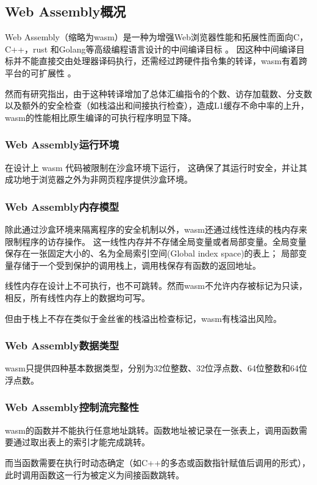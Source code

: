 \subsection{Web Assembly概况}
Web Assembly（缩略为wasm）是一种为增强Web浏览器性能和拓展性而面向C，C++，rust 和Golang等高级编程语言设计的中间编译目标
\cite{wasmCommunityGroup, lehmannWasabiFrameworkDynamically2019, lehmannEverythingOldNew, bhansaliFirstLookCode2022, waseemIssuesTheirCauses2024}。\nolinebreak
因这种中间编译目标并不能直接交由处理器译码执行，还需经过跨硬件指令集的转译，wasm有着跨平台的可扩展性
\cite{lehmannEverythingOldNew, waseemIssuesTheirCauses2024, lehmannWasabiFrameworkDynamically2019, JayProvablySafe}。

然而有研究\cite{JangdaNotsoFast}指出，由于这种转译增加了总体汇编指令的个数、访存加载数、分支数以及额外的安全检查（如栈溢出和间接执行检查），造成L1缓存不命中率的上升，wasm的性能相比原生编译的可执行程序明显下降。

\subsubsection{Web Assembly运行环境}
在设计上 wasm 代码被限制在沙盒环境下运行\cite{johnsonWaVeVerifiablySecure2023,WasmbpfStreamliningEBPF2024}，
这确保了其运行时安全，并让其成功地于浏览器之外为非网页程序提供沙盒环境\cite{narayanSwivelHardeningWebAssembly, WebAssemblySummaryOnSecurity, 9156135}。

\subsubsection{Web Assembly内存模型}
除此通过沙盒环境来隔离程序的安全机制以外，wasm还通过线性连续的栈内存来限制程序的访存操作。
这一线性内存并不存储全局变量或者局部变量。全局变量保存在一张固定大小的、名为全局索引空间(Global index space)的表上；
局部变量存储于一个受到保护的调用栈上，调用栈保存有函数的返回地址。

线性内存在设计上不可执行，也不可跳转。然而wasm不允许内存被标记为只读，相反，所有线性内存上的数据均可写\cite{lehmannEverythingOldNew}。

但由于栈上不存在类似于金丝雀的栈溢出检查标记，wasm有栈溢出风险。
\subsubsection{Web Assembly数据类型}
wasm只提供四种基本数据类型\cite{wasmCommunityGroup,lehmannEverythingOldNew}，分别为32位整数、32位浮点数、64位整数和64位浮点数。
\subsubsection{Web Assembly控制流完整性}
wasm的函数并不能执行任意地址跳转。函数地址被记录在一张表上，调用函数需要通过取出表上的索引才能完成跳转。

而当函数需要在执行时动态确定（如C++的多态或函数指针赋值后调用的形式），此时调用函数这一行为被定义为间接函数跳转\cite{Daniel2019DiscoveringVI}。